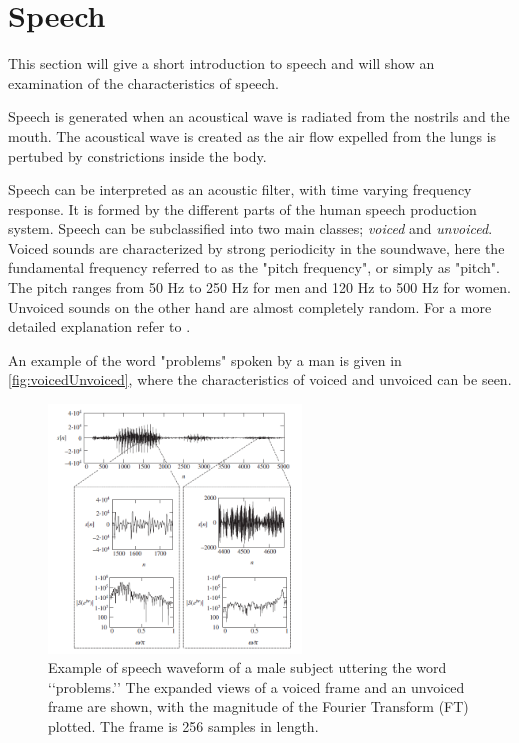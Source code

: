 \section{Speech} \label{sec:Speech}
This section will give a short introduction to speech and will show an examination of the characteristics of speech.

Speech is generated when an acoustical wave is radiated from the nostrils and the mouth. The acoustical wave is created as the air flow expelled from the lungs is pertubed by constrictions inside the body. 

Speech can be interpreted as an acoustic filter, with time varying frequency response. It is formed by the different parts of the human speech production system. Speech can be subclassified into two main classes; \textit{voiced} and \textit{unvoiced}. Voiced sounds are characterized by strong periodicity in the soundwave, here the fundamental frequency referred  to as the "pitch frequency", or simply as "pitch". The pitch ranges from 50 Hz to 250 Hz for men and 120 Hz to 500 Hz for women. Unvoiced sounds on the other hand are almost completely random. For a more detailed explanation refer to \citep{Speech}. 


An example of the word "problems" spoken by a man is given in \autoref{fig:voicedUnvoiced}, where the characteristics of voiced and unvoiced can be seen. 

\begin{figure}[H]
	\centering
	\includegraphics[width=0.6\textwidth]{figures/Speech/VoicedvsUnvoiced}
	\caption{Example of speech waveform of a male subject uttering the word ‘‘problems.’’ The expanded views of a voiced frame and an unvoiced frame are shown, with the magnitude of the Fourier Transform (FT) plotted. The frame is 256 samples in length.}
	\label{fig:voicedUnvoiced}
\end{figure}   


